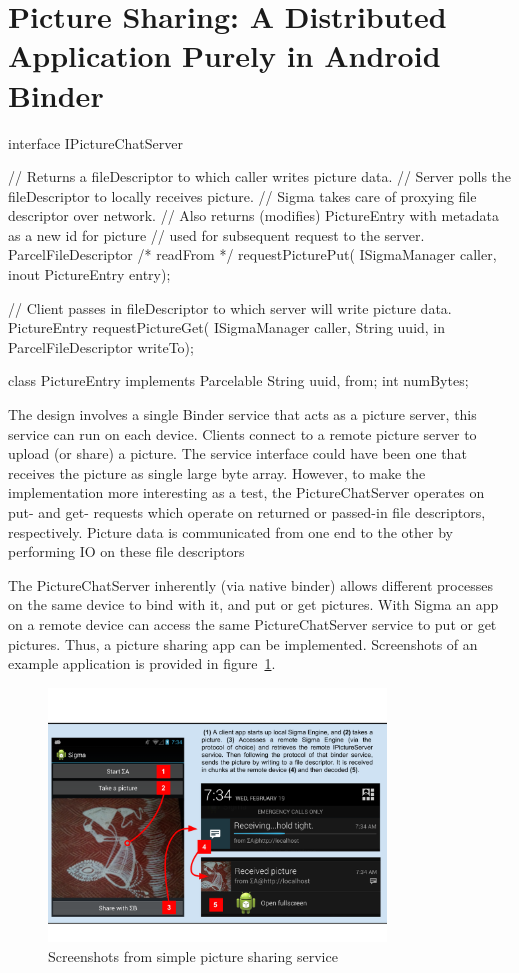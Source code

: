 \documentclass[prodmode]{acmlarge}
\begin{document}
\section{Picture Sharing: A Distributed Application Purely in Android Binder}
\label{sec:ExampleApplication}
\begin{snippet}
interface IPictureChatServer {
  // Returns a fileDescriptor to which caller writes picture data.
  // Server polls the fileDescriptor to locally receives picture.
  // Sigma takes care of proxying file descriptor over network.
  // Also returns (modifies) PictureEntry with metadata as a new id for picture
  // used for subsequent request to the server.
  ParcelFileDescriptor /* readFrom */ requestPicturePut(
    ISigmaManager caller, inout PictureEntry entry);

  // Client passes in fileDescriptor to which server will write picture data.
  PictureEntry requestPictureGet(
    ISigmaManager caller, String uuid, in ParcelFileDescriptor writeTo);
}

class PictureEntry implements Parcelable {
    String uuid, from;
    int numBytes;
}
\end{snippet}

The design involves a single Binder service that acts as a picture server, this service can run on each device. Clients connect to a remote picture server to upload (or share) a picture. The service interface could have been one that receives the picture as single large byte array. However, to make the implementation more interesting as a test, the PictureChatServer operates on put- and get- requests which operate on returned or passed-in file descriptors, respectively. Picture data is communicated from one end to the other by performing IO on these file descriptors

The PictureChatServer inherently (via native binder) allows different processes on the same device to bind with it, and put or get pictures. With Sigma an app on a remote device can access the same PictureChatServer service to put or get pictures. Thus, a picture sharing app can be implemented. Screenshots of an example application is provided in figure~\ref{fig:ExampleApplication}.

\begin{figure}[h]
\centering
\includegraphics[width=0.8\textwidth]{drawings/PictureChatExample.pdf}
\caption{Screenshots from simple picture sharing service}
\label{fig:ExampleApplication}
\end{figure}
\end{document}
